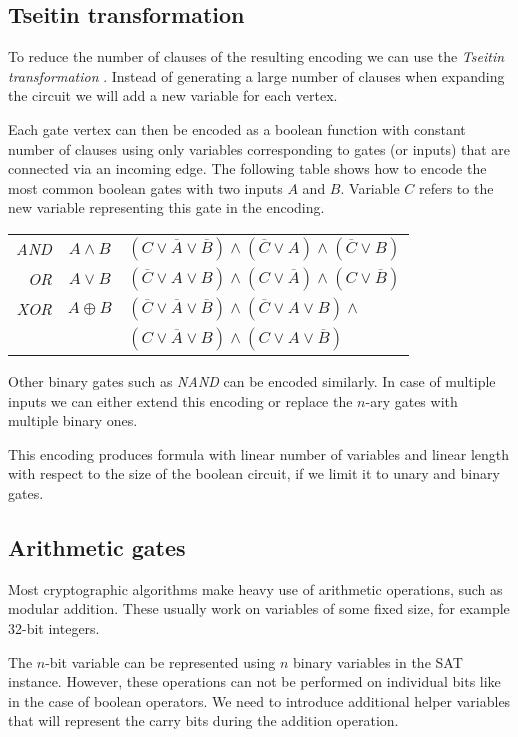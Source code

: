 \subsection{Tseitin transformation}
\label{sec:tseitin}
To reduce the number of clauses of the resulting encoding we can use the \emph{Tseitin transformation} \cite{tseitin1983complexity}.
Instead of generating a large number of clauses when expanding the circuit we will add a new variable for each vertex.

Each gate vertex can then be encoded as a boolean function with constant number of clauses using only variables corresponding to gates (or inputs) that are connected via an incoming edge.
The following table shows how to encode the most common boolean gates with two inputs $A$ and $B$.
Variable $C$ refers to the new variable representing this gate in the encoding.

\begin{tabular}{r c l}
\emph{AND}& $A\land B$ & $(C \lor \overline{A} \lor \overline{B}) \land (\overline{C} \lor A) \land (\overline{C} \lor B)$ \\
\emph{OR} & $A\lor B$ & $(\overline{C} \lor A \lor B) \land (C \lor \overline{A}) \land (C \lor \overline{B})$ \\
\emph{XOR} & $A\oplus B$ & $(\overline{C} \lor \overline{A} \lor \overline{B}) \land (\overline{C} \lor A \lor B) \land$\\
& & $(C \lor \overline{A} \lor B) \land (C \lor A \lor \overline{B})$
\end{tabular}

Other binary gates such as \emph{NAND} can be encoded similarly.
In case of multiple inputs we can either extend this encoding or replace the $n$-ary gates with multiple binary ones.

This encoding produces formula with linear number of variables and linear length with respect to the size of the boolean circuit, if we limit it to unary and binary gates.

\subsection{Arithmetic gates}
Most cryptographic algorithms make heavy use of arithmetic operations, such as modular addition.
These usually work on variables of some fixed size, for example 32-bit integers.

The $n$-bit variable can be represented using $n$ binary variables in the SAT instance.
However, these operations can not be performed on individual bits like in the case of boolean operators.
We need to introduce additional helper variables that will represent the carry bits during the addition operation.

